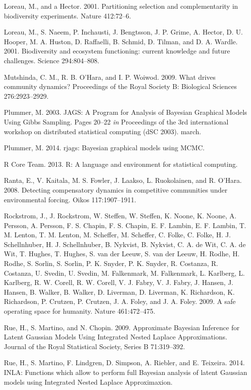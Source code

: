 \documentclass[12pt,]{article}
\begin{document}
Loreau, M., and a Hector. 2001. Partitioning selection and
complementarity in biodiversity experiments. Nature 412:72--6.

Loreau, M., S. Naeem, P. Inchausti, J. Bengtsson, J. P. Grime, A.
Hector, D. U. Hooper, M. A. Huston, D. Raffaelli, B. Schmid, D. Tilman,
and D. A. Wardle. 2001. Biodiversity and ecosystem functioning: current
knowledge and future challenges. Science 294:804--808.

Mutshinda, C. M., R. B. O'Hara, and I. P. Woiwod. 2009. What drives
community dynamics? Proceedings of the Royal Society B: Biological
Sciences 276:2923--2929.

Plummer, M. 2003. JAGS: A Program for Analysis of Bayesian Graphical
Models Using Gibbs Sampling. Pages 20--22 \emph{in} Proceedings of the
3rd international workshop on distributed statistical computing (dSC
2003). march.

Plummer, M. 2014. rjags: Bayesian graphical models using MCMC.

R Core Team. 2013. R: A language and environment for statistical
computing.

Ranta, E., V. Kaitala, M. S. Fowler, J. Laakso, L. Ruokolainen, and R.
O'Hara. 2008. Detecting compensatory dynamics in competitive communities
under environmental forcing. Oikos 117:1907--1911.

Rockstrom, J., J. Rockstrom, W. Steffen, W. Steffen, K. Noone, K. Noone,
A. Persson, A. Persson, F. S. Chapin, F. S. Chapin, E. F. Lambin, E. F.
Lambin, T. M. Lenton, T. M. Lenton, M. Scheffer, M. Scheffer, C. Folke,
C. Folke, H. J. Schellnhuber, H. J. Schellnhuber, B. Nykvist, B.
Nykvist, C. A. de Wit, C. A. de Wit, T. Hughes, T. Hughes, S. van der
Leeuw, S. van der Leeuw, H. Rodhe, H. Rodhe, S. Sorlin, S. Sorlin, P. K.
Snyder, P. K. Snyder, R. Costanza, R. Costanza, U. Svedin, U. Svedin, M.
Falkenmark, M. Falkenmark, L. Karlberg, L. Karlberg, R. W. Corell, R. W.
Corell, V. J. Fabry, V. J. Fabry, J. Hansen, J. Hansen, B. Walker, B.
Walker, D. Liverman, D. Liverman, K. Richardson, K. Richardson, P.
Crutzen, P. Crutzen, J. A. Foley, and J. A. Foley. 2009. A safe
operating space for humanity. Nature 461:472--475.

Rue, H., S. Martino, and N. Chopin. 2009. Approximate Bayesian Inference
for Latent Gaussian Models Using Integrated Nested Laplace
Approximations. Journal of the Royal Statistical Society, Series B
71:319--392.

Rue, H., S. Martino, F. Lindgren, D. Simpson, A. Riebler, and E.
Teixeira. 2014. INLA: Functions which allow to perform full Bayesian
analysis of latent Gaussian models using Integrated Nested Laplace
Approximaxion.
\end{document}
